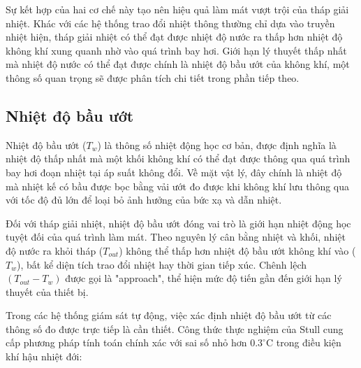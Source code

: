 \documentclass[../main.tex]{subfiles}
\begin{document}

Sự kết hợp của hai cơ chế này tạo nên hiệu quả làm mát vượt trội của tháp giải nhiệt. Khác với các hệ thống trao đổi nhiệt thông thường chỉ dựa vào truyền nhiệt hiện, tháp giải nhiệt có thể đạt được nhiệt độ nước ra thấp hơn nhiệt độ không khí xung quanh nhờ vào quá trình bay hơi. Giới hạn lý thuyết thấp nhất mà nhiệt độ nước có thể đạt được chính là nhiệt độ bầu ướt của không khí, một thông số quan trọng sẽ được phân tích chi tiết trong phần tiếp theo.

\subsection{Nhiệt độ bầu ướt}
\label{sec:wet_bulb_temperature}

Nhiệt độ bầu ướt ($T_w$) là thông số nhiệt động học cơ bản, được định nghĩa là nhiệt độ thấp nhất mà một khối không khí có thể đạt được thông qua quá trình bay hơi đoạn nhiệt tại áp suất không đổi. Về mặt vật lý, đây chính là nhiệt độ mà nhiệt kế có bầu được bọc bằng vải ướt đo được khi không khí lưu thông qua với tốc độ đủ lớn để loại bỏ ảnh hưởng của bức xạ và dẫn nhiệt.

Đối với tháp giải nhiệt, nhiệt độ bầu ướt đóng vai trò là giới hạn nhiệt động học tuyệt đối của quá trình làm mát. Theo nguyên lý cân bằng nhiệt và khối, nhiệt độ nước ra khỏi tháp ($T_{out}$) không thể thấp hơn nhiệt độ bầu ướt không khí vào ($T_w$), bất kể diện tích trao đổi nhiệt hay thời gian tiếp xúc. Chênh lệch $(T_{out} - T_w)$ được gọi là "approach", thể hiện mức độ tiến gần đến giới hạn lý thuyết của thiết bị.

Trong các hệ thống giám sát tự động, việc xác định nhiệt độ bầu ướt từ các thông số đo được trực tiếp là cần thiết. Công thức thực nghiệm của Stull \cite{stull2011meteorology} cung cấp phương pháp tính toán chính xác với sai số nhỏ hơn $0.3^\circ\mathrm{C}$ trong điều kiện khí hậu nhiệt đới:
\end{document}
